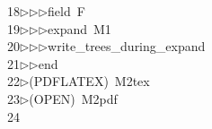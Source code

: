 \begin{tabbing}
18\>$\triangleright$\>$\triangleright$\>$\triangleright$\>field\ F\ \\[0pt]
19\>$\triangleright$\>$\triangleright$\>$\triangleright$\>expand\ M1\ \\[0pt]
20\>$\triangleright$\>$\triangleright$\>$\triangleright$\>write\_trees\_during\_expand\ \\[0pt]
21\>$\triangleright$\>$\triangleright$\>end\\[0pt]
22\>$\triangleright$\>(PDFLATEX)\ M2tex\\[0pt]
23\>$\triangleright$\>(OPEN)\ M2pdf\\[0pt]
24\>\end{tabbing}
